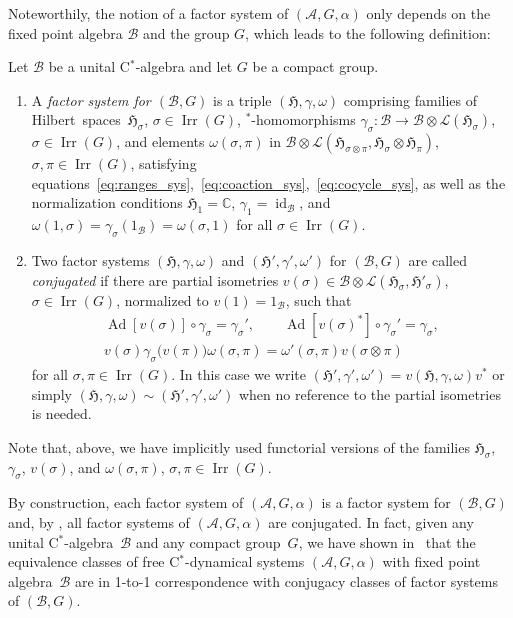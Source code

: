\documentclass[11pt]{article}
\numberwithin{equation}{section}
\numberwithin{equation}{section}
\newcommand*{\C}{\mathbb C}		%
\newcommand*{\tensor}{\otimes}		%
\DeclareMathOperator{\id}{id}		%
\DeclareMathOperator{\Ad}{Ad}		%
\newcommand*{\Star}{$^*$\nobreakdash}
\newcommand*{\hilb}{\mathfrak}		%
\newcommand*{\alg}{\mathcal}		%
\newcommand*{\hH}{\hilb{H}}			%
\newcommand*{\one}{1}				%
\newcommand*{\aA}{\alg{A}}			%
\newcommand*{\aB}{\alg{B}} 			%
\newcommand*{\End}{\mathcal{L}} %
\DeclareMathOperator{\Irrep}{Irr} 			%
\begin{document}
Noteworthily, the notion of a factor system of $(\aA, G, \alpha)$ only depends on the fixed point algebra $\aB$ and the group $G$, which leads to the following definition:

\begin{Definition}\label{def:conjugancy}
	Let $\aB$ be a unital C\Star-algebra and let $G$ be a compact group.
	\begin{enumerate}\itemsep=0pt
	\item 		
		A \emph{factor system for $(\aB,G)$} is a triple $(\hH, \gamma, \omega)$ comprising families of Hilbert~spaces~$\hH_\sigma$, $\sigma \in \Irrep(G)$, \Star-homomorphisms $\gamma_\sigma\colon \aB \to \aB \tensor \End(\hH_\sigma)$, $\sigma \in \Irrep(G)$, and elements $\omega(\sigma, \pi)$ in $\aB \tensor \End(\hH_{\sigma \tensor \pi}, \hH_\sigma \tensor \hH_\pi)$, $\sigma, \pi\in \Irrep(G)$, satisfying equations~\eqref{eq:ranges_sys},~\eqref{eq:coaction_sys},~\eqref{eq:cocycle_sys}, as well as the normalization conditions $\hH_1 = \C$, $\gamma_1 = \id_\aB$, and $\omega(1, \sigma) = \gamma_\sigma(\one_\aB) = \omega(\sigma, 1)$ for all $\sigma \in \Irrep(G)$.
	\item
		Two factor systems $(\hH, \gamma, \omega)$ and $(\hH', \gamma', \omega')$ for $(\aB,G)$ are called \emph{conjugated} if there are partial isometries $v(\sigma) \in \aB \tensor \End(\hH_\sigma,\hH'_\sigma)$, $\sigma \in \Irrep(G)$, normalized to $v(1) = \one_\aB$, such that
		\begin{gather*}
			\Ad[v(\sigma)] \circ \gamma_\sigma = \gamma_\sigma',
			\qquad
			\Ad[v(\sigma)^*] \circ \gamma_\sigma' = \gamma_\sigma,		\\
			v(\sigma) \gamma_\sigma\bigl( v(\pi) \bigr) \omega(\sigma, \pi)
			= \omega'(\sigma, \pi) v(\sigma \tensor \pi)
		\end{gather*}
		for all $\sigma, \pi \in \Irrep(G)$.
		In this case we write $(\hH',\gamma', \omega') = v(\hH, \gamma, \omega)v^*$ or simply $(\hH,\gamma, \omega) \sim (\hH', \gamma', \omega')$ when no reference to the partial isometries is needed.
	\end{enumerate}
Note that, above, we have implicitly used functorial versions of the families $\hH_\sigma$, $\gamma_\sigma$, $v(\sigma)$, and $\omega(\sigma, \pi)$, $\sigma, \pi \in \Irrep(G)$.
\end{Definition}

By construction, each factor system of $(\aA,G,\alpha)$ is a factor system for $(\aB,G)$ and, by \cite[Lemma~4.3]{SchWa17c}, all factor systems of $(\aA, G, \alpha)$ are conjugated. In fact, given any unital C\Star\nobreakdash-algebra~$\aB$ and any compact group~$G$, we have shown in~\cite[Section~5]{SchWa17c} that the equivalence classes of free C\Star-dynamical systems $(\aA, G, \alpha)$ with fixed point algebra~$\aB$ are in 1-to-1 correspondence with conjugacy classes of factor systems of $(\aB,G)$.
\end{document}

